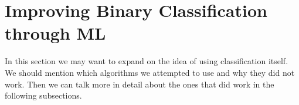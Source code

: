 \section{Improving Binary Classification through ML}
\label{sec:ML_concept}
In this section we may want to expand on the idea of using classification itself.
We should mention which algorithms we attempted to use and why they did not
work. Then we can talk more in detail about the ones that did work in the
following subsections.